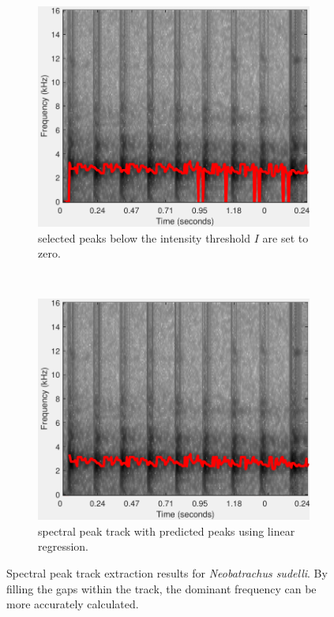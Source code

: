 \begin{figure}[htb!]
\centering
        \begin{subfigure}[b]{0.5\textwidth}
                \includegraphics[width=\textwidth]{image/Ch5/peak.pdf}
                \caption{selected peaks below the intensity threshold $I$ are set to zero.}
        \end{subfigure}%
        \\ 
        \begin{subfigure}[b]{0.5\textwidth}
                \includegraphics[width=\textwidth]{image/Ch5/track.pdf}
                \caption{spectral peak track with predicted peaks using linear regression.}
        \end{subfigure}
        \caption[Spectral peak track extraction results]{Spectral peak track extraction results for \textit{Neobatrachus sudelli}. By filling the gaps within the track, the dominant frequency can be more accurately calculated.}       
        \label{fig:track}
\end{figure}


